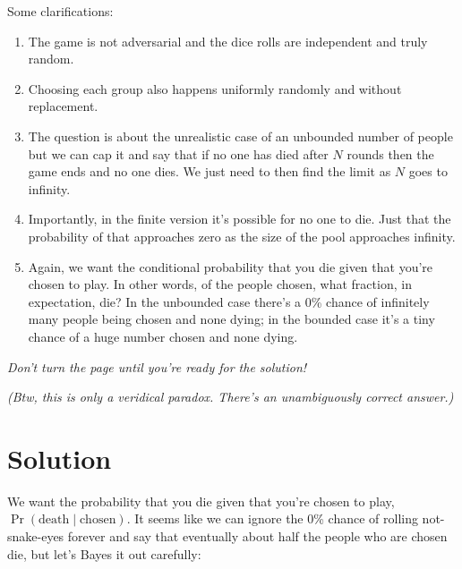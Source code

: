 \documentclass[article,twocolumn]{memoir}
\begin{document}
\newpage

Some clarifications:

\begin{enumerate}
\item The game is not adversarial and the dice rolls are independent and truly random.
\item Choosing each group also happens uniformly randomly and without replacement.
\item The question is about the unrealistic case of an unbounded number of people but we can cap it and say that if no one has died after $N$ rounds then the game ends and no one dies. 
We just need to then find the limit as $N$ goes to infinity. 
\item Importantly, in the finite version it's possible for no one to die. 
Just that the probability of that approaches zero as the size of the pool approaches infinity.
\item Again, we want the conditional probability that you die given that you're chosen to play.
In other words, of the people chosen, what fraction, in expectation, die?
In the unbounded case there's a 0\% chance of infinitely many people being chosen and none dying; in the bounded case it's a tiny chance of a huge number chosen and none dying.
\end{enumerate}

\vspace{2em}
\noindent
\emph{Don't turn the page until you're ready for the solution!}

\vspace{2em}
\noindent
\emph{(Btw, this is only a veridical paradox. There's an unambiguously correct answer.)}

\newpage

\chapter*{Solution}

We want the probability that you die given that you're chosen to play, 
$\Pr(\text{death} \mid \text{chosen})$.
It seems like we can ignore the 0\% chance of rolling not-snake-eyes forever and say that eventually about half the people who are chosen die, but let's Bayes it out carefully:
\end{document}
